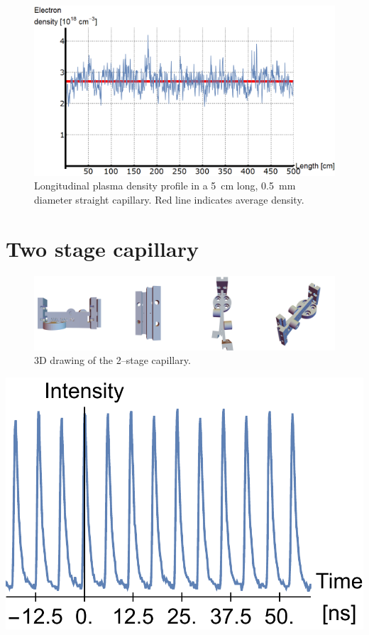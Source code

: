 \documentclass[../main.tex]{subfiles}
\begin{document}
\begin{figure}
    \centering
    \includegraphics[width=\textwidth]{figures/spectro/longitudinal_profile.png}
    \caption{Longitudinal plasma density profile in a \SI{5}{\cm} long, \SI{0.5}{\mm} diameter straight capillary. Red line indicates average density.}
    \label{fig:longi_profile}
\end{figure}

\section{Two stage capillary}

\begin{figure}[b]
    \centering
    \includegraphics[width=\textwidth]{figures/doublecapillary_cad.png}
    \caption{3D drawing of the 2--stage capillary.}
    \label{fig:doublecapillaryCAD}
\end{figure}

\begin{marginfigure}
\includegraphics[width=\marginparwidth]{figures/oscillator/double.pdf}
\label{fig:oscillator_double}
\caption{Two \SI{84}{\MHz} temporal beam profiles of the oscillator laser, one delayed with respect to the other.}
\end{marginfigure}
\end{document}
